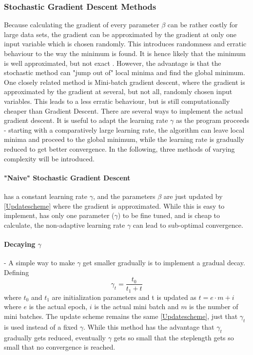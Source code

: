 \documentclass[11pt,a4paper,titlepage]{article}
\begin{document}
\subsubsection{Stochastic Gradient Descent Methods}
Because calculating the gradient of every parameter $\beta$ can be rather costly for large data sets, the gradient can be approximated by the gradient at only one input variable which is chosen randomly. This introduces randomness and erratic behaviour to the way the minimum is found. It is hence likely that the minimum is well approximated, but not exact \citep{handsOnMachineLearning}. However, the advantage is that the stochastic method can "jump out of" local minima and find the global minimum. One closely related method is Mini-batch gradient descent, where the gradient is approximated by the gradient at several, but not all, randomly chosen input variables. This leads to a less erratic behaviour, but is still computationally cheaper than Gradient Descent.
There are several ways to implement the actual gradient descent. It is useful to adapt the learning rate $\gamma$ as the program proceeds - starting with a comparatively large learning rate, the algorithm can  leave local minima and proceed to the global minimum, while the learning rate is gradually reduced to get better convergence. In the following, three methods of varying complexity will be introduced.
\paragraph*{"Naive" Stochastic Gradient Descent} has a constant learning rate $\gamma$, and the parameters $\beta$ are just updated by \eqref{Updatescheme} where the gradient is approximated. While this is easy to implement, has only one parameter ($\gamma$) to be fine tuned, and is cheap to calculate, the non-adaptive learning rate $\gamma$ can lead to sub-optimal convergence.
\paragraph*{Decaying $\gamma$}
- A simple way to make $\gamma$ get smaller gradually is to implement a gradual decay. Defining
\begin{equation}
\gamma_t=\frac{t_0}{t_1+t}
\end{equation}
where $t_0$ and $t_1$ are initialization parameters and t is updated as $t=e\cdot m+i$ where $e$ is the actual epoch, $i$ is the actual mini batch and $m$ is the number of mini batches. The update scheme remains the same \eqref{Updatescheme}, just that $\gamma_t$ is used instead of a fixed $\gamma$. While this method has the advantage that $\gamma_t$ gradually gets reduced, eventually $\gamma$ gets so small that the steplength gets so small that no convergence is reached.
\end{document}
